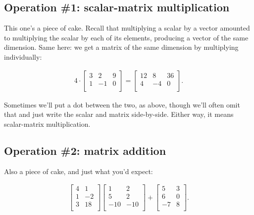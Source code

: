 \subsection{Operation \#1: scalar-matrix multiplication}
\label{scalarMatrixMultiplication}

This one's a piece of cake. Recall that multiplying a scalar by a vector
amounted to multiplying the scalar by each of its elements, producing a vector
of the same dimension. Same here: we get a matrix of the same dimension by
multiplying individually:

\vspace{-.15in}
\begin{align*}
4 \cdot
\begin{bmatrix}
3 & 2 & 9 \\
1 & -1 & 0 \\
\end{bmatrix}
=
\begin{bmatrix}
12 & 8 & 36 \\
4 & -4 & 0 \\
\end{bmatrix}.
\end{align*}
\vspace{-.15in}

Sometimes we'll put a dot between the two, as above, though we'll often omit
that and just write the scalar and matrix side-by-side. Either way, it means
scalar-matrix multiplication.

\subsection{Operation \#2: matrix addition}
\label{matrixAddition}

Also a piece of cake, and just what you'd expect:

\vspace{-.15in}
\begin{align*}
\begin{bmatrix}
4 & 1 \\
1 & -2 \\
3 & 18 \\
\end{bmatrix}
\begin{bmatrix}
1 & 2 \\
5 & 2 \\
-10 & -10 \\
\end{bmatrix}
+
\begin{bmatrix}
5 & 3 \\
6 & 0 \\
-7 & 8 \\
\end{bmatrix}.
\end{align*}
\vspace{-.15in}

